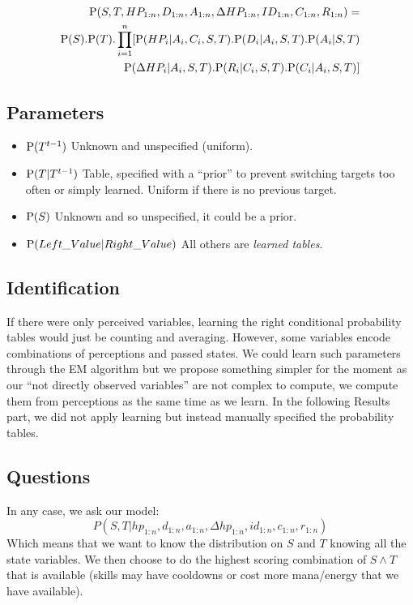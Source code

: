 \begin{eqnarray*}
\mathrm{P}(S, T, HP_{1:n}, D_{1:n}, A_{1:n}, \Delta HP_{1:n}, ID_{1:n}, C_{1:n}, R_{1:n}) = \\
\mathrm{P}(S).\mathrm{P}(T).\prod_{i=1}^n [ \mathrm{P}(HP_i | A_i, C_i, S, T).\mathrm{P}(D_i | A_i, S, T).\mathrm{P}(A_i | S, T) \\
        \mathrm{P}(\Delta HP_i | A_i, S, T). \mathrm{P}(R_i | C_i, S, T). \mathrm{P}(C_i | A_i, S, T) ]
\end{eqnarray*}


\subsection{Parameters}

\begin{itemize}
    \item $\mathrm{P}(T^{t-1})$ Unknown and unspecified (uniform).
    \item $\mathrm{P}(T|T^{t-1})$ Table, specified with a ``prior'' to prevent switching targets too often or simply learned. Uniform if there is no previous target.
    \item $\mathrm{P}(S)$ Unknown and so unspecified, it could be a prior.
    \item $\mathrm{P}(Left\_Value | Right\_Value)$ All others are \textit{learned tables}.
\end{itemize}

\subsection{Identification}

If there were only perceived variables, learning the right conditional probability tables would just be counting and averaging. However, some variables encode combinations of perceptions and passed states. We could learn such parameters through the EM algorithm but we propose something simpler for the moment as our ``not directly observed variables'' are not complex to compute, we compute them from perceptions as the same time as we learn. In the following Results part, we did not apply learning but instead manually specified the probability tables.

\subsection{Questions}

In any case, we ask our model:\\
$$P(S,T|hp_{1:n},d_{1:n}, a_{1:n}, \Delta hp_{1:n}, id_{1:n}, c_{1:n}, r_{1:n})$$ 
Which means that we want to know the distribution on $S$ and $T$ knowing all the state variables. We then choose to do the highest scoring combination of $S \wedge T$ that is available (skills may have cooldowns or cost more mana/energy that we have available).

